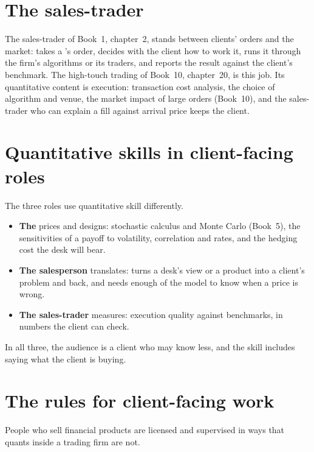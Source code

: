\section{The sales-trader}

The sales-trader of Book~1, chapter~2, stands between clients' orders and the market: takes a 's order,
decides with the client how to work it, runs it through the firm's algorithms or its traders, and reports the result
against the client's benchmark. The high-touch trading of Book~10, chapter~20, is this job. Its quantitative content is
execution: transaction cost analysis, the choice of algorithm and venue, the market impact of large orders (Book~10), and
the sales-trader who can explain a fill against arrival price keeps the client.

\section{Quantitative skills in client-facing roles}

The three roles use quantitative skill differently.
\begin{itemize}
\item \textbf{The } prices and designs: stochastic calculus and Monte Carlo (Book~5), the sensitivities of a
payoff to volatility, correlation and rates, and the hedging cost the desk will bear.
\item \textbf{The salesperson} translates: turns a desk's view or a product into a client's problem and back, and needs
enough of the model to know when a price is wrong.
\item \textbf{The sales-trader} measures: execution quality against benchmarks, in numbers the client can check.
\end{itemize}
In all three, the audience is a client who may know less, and the skill includes saying what the client is buying.

\section{The rules for client-facing work}

People who sell financial products are licensed and supervised in ways that quants inside a trading firm are not.


